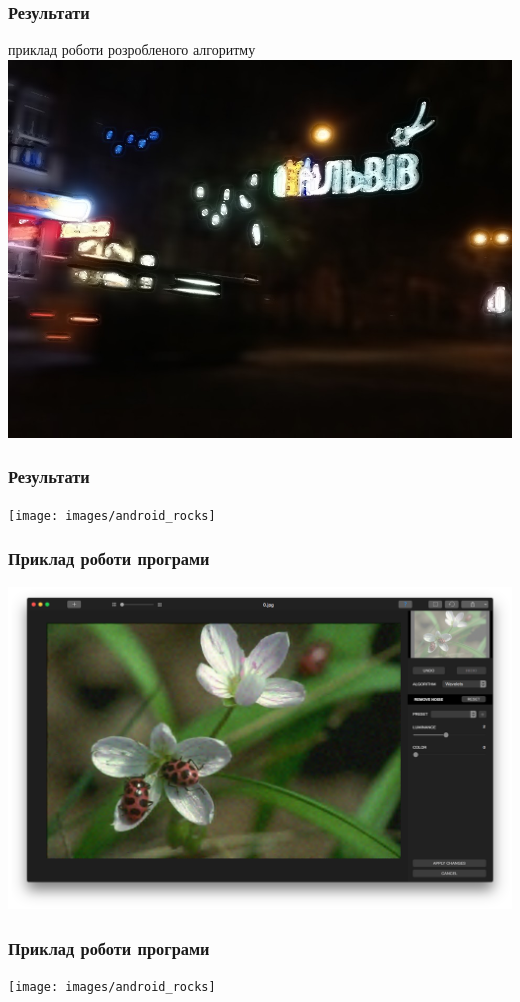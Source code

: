 \documentclass[12pt]{beamer}
\begin{document}
\begin{frame}\frametitle{ Результати}
	приклад роботи розробленого алгоритму
	\includegraphics[scale=0.3]{images/lviv_mine}
\end{frame}
\begin{frame}\frametitle{ Результати}
	\texttt{[image: images/android\_rocks]}
\end{frame}
\begin{frame}\frametitle{ Приклад роботи програми}
	\includegraphics[scale=0.18]{images/cocoa}
	
	
\end{frame}
\begin{frame}\frametitle{ Приклад роботи програми}
	
	\texttt{[image: images/android\_rocks]}
\end{frame}
\end{document}
